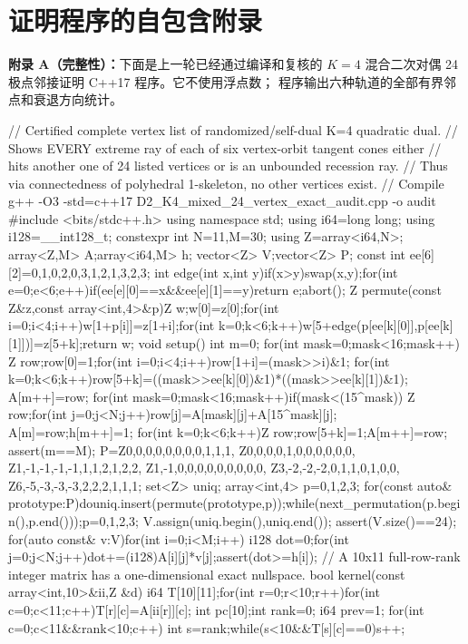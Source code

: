 \documentclass[11pt,a4paper]{ctexart}
\theoremstyle{remark}\newtheorem{remark}[theorem]{备注}
\begin{document}
\section{证明程序的自包含附录}
\noindent\textbf{附录 A（完整性）：}下面是上一轮已经通过编译和复核的
$K=4$ 混合二次对偶 24 极点邻接证明 C++17 程序。它不使用浮点数；
程序输出六种轨道的全部有界邻点和衰退方向统计。
\begin{CodeListing}
// Certified complete vertex list of randomized/self-dual K=4 quadratic dual.
// Shows EVERY extreme ray of each of six vertex-orbit tangent cones either
// hits another one of 24 listed vertices or is an unbounded recession ray.
// Thus via connectedness of polyhedral 1-skeleton, no other vertices exist.
// Compile g++ -O3 -std=c++17 D2_K4_mixed_24_vertex_exact_audit.cpp -o audit
#include <bits/stdc++.h>
using namespace std;
using i64=long long; using i128=__int128_t;
constexpr int N=11,M=30;
using Z=array<i64,N>;
array<Z,M> A;array<i64,M> h;
vector<Z> V;vector<Z> P;
const int ee[6][2]={{0,1},{0,2},{0,3},{1,2},{1,3},{2,3}};
int edge(int x,int y){if(x>y)swap(x,y);for(int e=0;e<6;e++)if(ee[e][0]==x&&ee[e][1]==y)return e;abort();}
Z permute(const Z&z,const array<int,4>&p){Z w{};w[0]=z[0];for(int i=0;i<4;i++)w[1+p[i]]=z[1+i];for(int k=0;k<6;k++)w[5+edge(p[ee[k][0]],p[ee[k][1]])]=z[5+k];return w;}
void setup(){
 int m=0;
 for(int mask=0;mask<16;mask++){
  Z row{};row[0]=1;for(int i=0;i<4;i++)row[1+i]=(mask>>i)&1;
  for(int k=0;k<6;k++)row[5+k]=((mask>>ee[k][0])&1)*((mask>>ee[k][1])&1);
  A[m++]=row;
 }
 for(int mask=0;mask<16;mask++)if(mask<(15^mask)){
  Z row{};for(int j=0;j<N;j++)row[j]=A[mask][j]+A[15^mask][j];
  A[m]=row;h[m++]=1;
 }
 for(int k=0;k<6;k++){Z row{};row[5+k]=1;A[m++]=row;}
 assert(m==M);
 P={Z{0,0,0,0,0,0,0,0,1,1,1},
    Z{0,0,0,0,1,0,0,0,0,0,0},
    Z{1,-1,-1,-1,-1,1,1,2,1,2,2},
    Z{1,-1,0,0,0,0,0,0,0,0,0},
    Z{3,-2,-2,-2,0,1,1,0,1,0,0},
    Z{6,-5,-3,-3,-3,2,2,2,1,1,1}};
 set<Z> uniq;
 array<int,4> p={0,1,2,3};
 for(const auto& prototype:P){do{uniq.insert(permute(prototype,p));}while(next_permutation(p.begin(),p.end()));p={0,1,2,3};}
 V.assign(uniq.begin(),uniq.end());
 assert(V.size()==24);
 for(auto const& v:V)for(int i=0;i<M;i++){
  i128 dot=0;for(int j=0;j<N;j++)dot+=(i128)A[i][j]*v[j];assert(dot>=h[i]);}
}
// A 10x11 full-row-rank integer matrix has a one-dimensional exact nullspace.
bool kernel(const array<int,10>&ii,Z &d){
 i64 T[10][11];for(int r=0;r<10;r++)for(int c=0;c<11;c++)T[r][c]=A[ii[r]][c];
 int pc[10];int rank=0; i64 prev=1;
 for(int c=0;c<11&&rank<10;c++){
  int s=rank;while(s<10&&T[s][c]==0)s++;
}}
\end{CodeListing}
\end{document}
